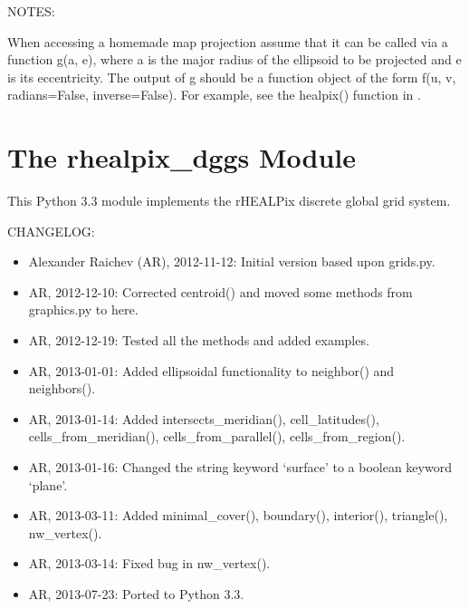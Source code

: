 \documentclass[a4paper,12ptopenany,oneside]{sphinxmanual}
\begin{document}
\begin{fulllineitems}
NOTES:

When accessing a homemade map projection assume that it can be called via
a function g(a, e), where a is the major radius of the ellipsoid to be 
projected and e is its eccentricity.
The output of g should be a function object of the form 
f(u, v, radians=False, inverse=False).
For example, see the healpix() function in .

\end{fulllineitems}



\chapter{The rhealpix\_dggs Module}
\label{rhealpix_dggs:the-rhealpix-dggs-module}\label{rhealpix_dggs:module-rhealpix_dggs}\label{rhealpix_dggs::doc}
This Python 3.3 module implements the rHEALPix discrete global grid system.

CHANGELOG:
\begin{itemize}
\item {} 
Alexander Raichev (AR), 2012-11-12: Initial version based upon grids.py.

\item {} 
AR, 2012-12-10: Corrected centroid() and moved some methods from graphics.py to here.

\item {} 
AR, 2012-12-19: Tested all the methods and added examples.

\item {} 
AR, 2013-01-01: Added ellipsoidal functionality to neighbor() and neighbors().

\item {} 
AR, 2013-01-14: Added intersects\_meridian(), cell\_latitudes(), cells\_from\_meridian(), cells\_from\_parallel(), cells\_from\_region().

\item {} 
AR, 2013-01-16: Changed the string keyword `surface' to a boolean keyword `plane'.

\item {} 
AR, 2013-03-11: Added minimal\_cover(), boundary(), interior(), triangle(), nw\_vertex().

\item {} 
AR, 2013-03-14: Fixed bug in nw\_vertex().

\item {} 
AR, 2013-07-23: Ported to Python 3.3.

\end{itemize}
\end{document}
